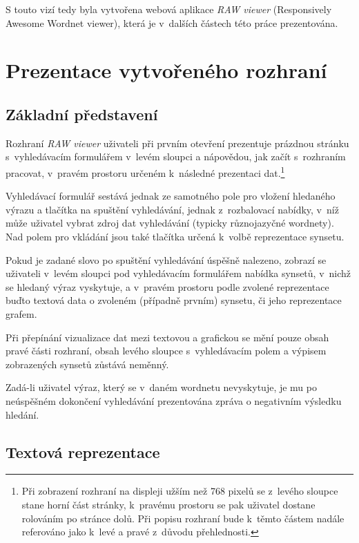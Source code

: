 \documentclass[a4paper, 11pt, oneside, showtrims]{book}
\newcommand{\simplywn}{\textit{RAW viewer} }
\begin{document}
				S touto vizí tedy byla vytvořena webová aplikace \simplywn (Responsively Awesome Wordnet viewer), která je v~dalších částech této práce prezentována.

		\chapter{Prezentace vytvořeného rozhraní}
		\label{cha:ui}

			\section{Základní představení}

				Rozhraní \simplywn uživateli při prvním otevření prezentuje prázdnou stránku s~vyhledávacím formulářem v~levém sloupci a nápovědou, jak začít s~rozhraním pracovat, v~pravém prostoru určeném k~následné prezentaci dat.\footnote{Při zobrazení rozhraní na displeji užším než 768 pixelů se z~levého sloupce stane horní část stránky, k~pravému prostoru se pak uživatel dostane rolováním po stránce dolů. Při popisu rozhraní bude k~těmto částem nadále referováno jako k~levé a pravé z~důvodu přehlednosti.}

				Vyhledávací formulář sestává jednak ze samotného pole pro vložení hledaného výrazu a tlačítka na spuštění vyhledávání, jednak z~rozbalovací nabídky, v~níž může uživatel vybrat zdroj dat vyhledávání (typicky různojazyčné wordnety). Nad polem pro vkládání jsou také tlačítka určená k~volbě reprezentace synsetu.

				Pokud je zadané slovo po spuštění vyhledávání úspěšně nalezeno, zobrazí se uživateli v~levém sloupci pod vyhledávacím formulářem nabídka synsetů, v~nichž se hledaný výraz vyskytuje, a v~pravém prostoru podle zvolené reprezentace buďto textová data o zvoleném (případně prvním) synsetu, či jeho reprezentace grafem.

				Při přepínání vizualizace dat mezi textovou a grafickou se mění pouze obsah pravé části rozhraní, obsah levého sloupce s~vyhledávacím polem a výpisem zobrazených synsetů zůstává neměnný.

				Zadá-li uživatel výraz, který se v~daném wordnetu nevyskytuje, je mu po neúspěšném dokončení vyhledávání prezentována zpráva o negativním výsledku hledání. 

			\section{Textová reprezentace}
			\label{cha:textovarepres}
\end{document}
